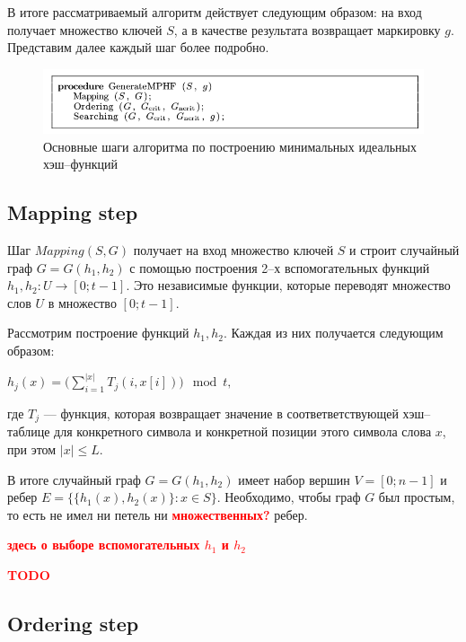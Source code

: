\documentclass[specialist,
               substylefile = spbu.rtx,
               subf,href,colorlinks=true, 12pt]{disser}
\begin{document}
В итоге рассматриваемый алгоритм действует следующим образом: на вход получает множество ключей $S$, а в качестве результата возвращает маркировку $g$. Представим далее каждый шаг более подробно.

\begin{figure}[h]
\begin{center}
\includegraphics[scale=0.5]{imgs/proc.jpg}
\caption{Основные шаги алгоритма по построению минимальных идеальных хэш--функций}
\end{center}
\end{figure}

\subsection{Mapping step}

Шаг $Mapping (S, G)$ получает на вход множество ключей $S$ и строит случайный граф $G = G(h_1, h_2)$  с помощью построения 2--х вспомогательных функций $h_1, h_2 : U \longrightarrow [0;t - 1]$. Это независимые функции, которые переводят множество слов $U$ в множество $[0; t - 1]$.

Рассмотрим построение функций $h_1, h_2$. Каждая из них получается следующим образом:
%
\begin{center}
$h_j(x) = \Big ( \sum \limits_{i = 1}^{|x|}T_j(i,x[i])\Big)\mod t,$
\end{center}
%
где $T_j$ --- функция, которая возвращает значение в соответветствующей хэш--таблице для конкретного символа и конкретной позиции этого символа слова $x$, при этом $|x| \leq L$.

В итоге случайный граф $G = G(h_1, h_2)$ имеет набор вершин $V = [0;n - 1]$ и ребер $E = \{\{h_1(x),h_2(x)\}: x \in S\}$. Необходимо, чтобы граф $G$ был простым, то есть не имел ни петель ни \textcolor{red}{\textbf{множественных?}} ребер.

\textcolor{red}{\textbf{здесь о выборе вспомогательных $h_1$ и $h_2$}}

\textcolor{red}{\textbf{TODO}}



\newpage

\subsection{Ordering step}
\end{document}
